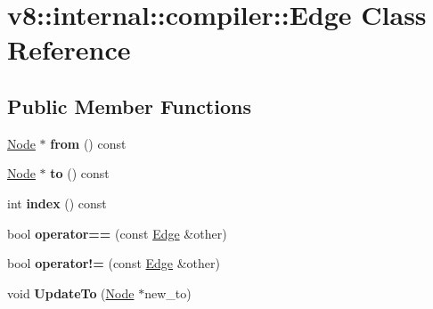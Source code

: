 \hypertarget{classv8_1_1internal_1_1compiler_1_1_edge}{}\section{v8\+:\+:internal\+:\+:compiler\+:\+:Edge Class Reference}
\label{classv8_1_1internal_1_1compiler_1_1_edge}
\subsection*{Public Member Functions}
\begin{DoxyCompactItemize}
\item 
\hyperlink{classv8_1_1internal_1_1compiler_1_1_node}{Node} $\ast$ {\bfseries from} () const \hypertarget{classv8_1_1internal_1_1compiler_1_1_edge_abc170577b5648b884eb16c03c3686b30}{}\label{classv8_1_1internal_1_1compiler_1_1_edge_abc170577b5648b884eb16c03c3686b30}

\item 
\hyperlink{classv8_1_1internal_1_1compiler_1_1_node}{Node} $\ast$ {\bfseries to} () const \hypertarget{classv8_1_1internal_1_1compiler_1_1_edge_ac247bbf59c76faa4d0b48c4a31528647}{}\label{classv8_1_1internal_1_1compiler_1_1_edge_ac247bbf59c76faa4d0b48c4a31528647}

\item 
int {\bfseries index} () const \hypertarget{classv8_1_1internal_1_1compiler_1_1_edge_af0858e728ccfca292f6bc3e41ed999d2}{}\label{classv8_1_1internal_1_1compiler_1_1_edge_af0858e728ccfca292f6bc3e41ed999d2}

\item 
bool {\bfseries operator==} (const \hyperlink{classv8_1_1internal_1_1compiler_1_1_edge}{Edge} \&other)\hypertarget{classv8_1_1internal_1_1compiler_1_1_edge_a7a782489563606761083e110bafde54e}{}\label{classv8_1_1internal_1_1compiler_1_1_edge_a7a782489563606761083e110bafde54e}

\item 
bool {\bfseries operator!=} (const \hyperlink{classv8_1_1internal_1_1compiler_1_1_edge}{Edge} \&other)\hypertarget{classv8_1_1internal_1_1compiler_1_1_edge_a9c6ebd00064b7a43e2b15e55b2967eac}{}\label{classv8_1_1internal_1_1compiler_1_1_edge_a9c6ebd00064b7a43e2b15e55b2967eac}

\item 
void {\bfseries Update\+To} (\hyperlink{classv8_1_1internal_1_1compiler_1_1_node}{Node} $\ast$new\+\_\+to)\hypertarget{classv8_1_1internal_1_1compiler_1_1_edge_ac4eb4e39211896db0cfe7786ab1c7abc}{}\label{classv8_1_1internal_1_1compiler_1_1_edge_ac4eb4e39211896db0cfe7786ab1c7abc}

\end{DoxyCompactItemize}
